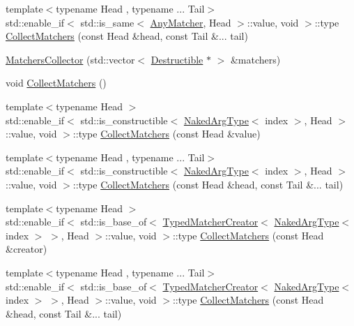 \begin{DoxyCompactItemize}
\item 
{\footnotesize template$<$typename Head , typename ... Tail$>$ }\\std\+::enable\+\_\+if$<$ std\+::is\+\_\+same$<$ \mbox{\hyperlink{structfakeit_1_1AnyMatcher}{Any\+Matcher}}, Head $>$\+::value, void $>$\+::type \mbox{\hyperlink{classfakeit_1_1MatchersCollector_a5bc97a3d729b1bb67e372181ad88b77d}{Collect\+Matchers}} (const Head \&head, const Tail \&... tail)
\item 
\mbox{\hyperlink{classfakeit_1_1MatchersCollector_ac5e0254e23626d189f329de8051137a6}{Matchers\+Collector}} (std\+::vector$<$ \mbox{\hyperlink{classfakeit_1_1Destructible}{Destructible}} $\ast$ $>$ \&matchers)
\item 
void \mbox{\hyperlink{classfakeit_1_1MatchersCollector_a2d9a08a347c3915daa33f307a274f13c}{Collect\+Matchers}} ()
\item 
{\footnotesize template$<$typename Head $>$ }\\std\+::enable\+\_\+if$<$ std\+::is\+\_\+constructible$<$ \mbox{\hyperlink{classfakeit_1_1MatchersCollector_aeda8ced6a2f0cb7c6e4f916f18a91730}{Naked\+Arg\+Type}}$<$ index $>$, Head $>$\+::value, void $>$\+::type \mbox{\hyperlink{classfakeit_1_1MatchersCollector_affd243a89f758239d77c70dce6318087}{Collect\+Matchers}} (const Head \&value)
\item 
{\footnotesize template$<$typename Head , typename ... Tail$>$ }\\std\+::enable\+\_\+if$<$ std\+::is\+\_\+constructible$<$ \mbox{\hyperlink{classfakeit_1_1MatchersCollector_aeda8ced6a2f0cb7c6e4f916f18a91730}{Naked\+Arg\+Type}}$<$ index $>$, Head $>$\+::value, void $>$\+::type \mbox{\hyperlink{classfakeit_1_1MatchersCollector_a29c5245d03b8fab3773455c087edde74}{Collect\+Matchers}} (const Head \&head, const Tail \&... tail)
\item 
{\footnotesize template$<$typename Head $>$ }\\std\+::enable\+\_\+if$<$ std\+::is\+\_\+base\+\_\+of$<$ \mbox{\hyperlink{structfakeit_1_1TypedMatcherCreator}{Typed\+Matcher\+Creator}}$<$ \mbox{\hyperlink{classfakeit_1_1MatchersCollector_aeda8ced6a2f0cb7c6e4f916f18a91730}{Naked\+Arg\+Type}}$<$ index $>$ $>$, Head $>$\+::value, void $>$\+::type \mbox{\hyperlink{classfakeit_1_1MatchersCollector_ae954aa74286bcd096169067f5e897356}{Collect\+Matchers}} (const Head \&creator)
\item 
{\footnotesize template$<$typename Head , typename ... Tail$>$ }\\std\+::enable\+\_\+if$<$ std\+::is\+\_\+base\+\_\+of$<$ \mbox{\hyperlink{structfakeit_1_1TypedMatcherCreator}{Typed\+Matcher\+Creator}}$<$ \mbox{\hyperlink{classfakeit_1_1MatchersCollector_aeda8ced6a2f0cb7c6e4f916f18a91730}{Naked\+Arg\+Type}}$<$ index $>$ $>$, Head $>$\+::value, void $>$\+::type \mbox{\hyperlink{classfakeit_1_1MatchersCollector_a40994e9802e933fb1bae91870d666dcb}{Collect\+Matchers}} (const Head \&head, const Tail \&... tail)

\end{DoxyCompactItemize}
